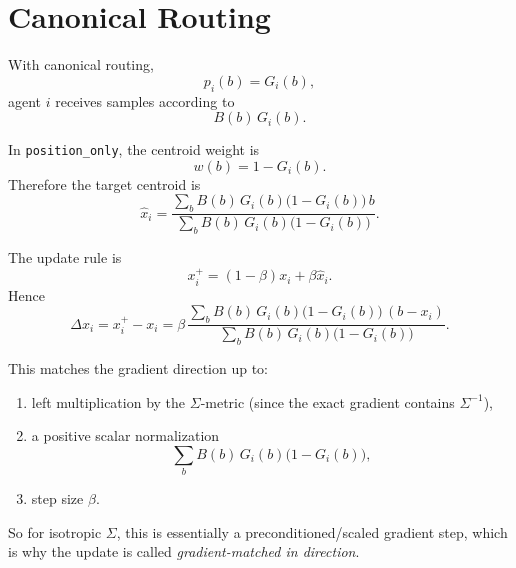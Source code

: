\documentclass{article}
\begin{document}
\section*{Canonical Routing}

With canonical routing,
\begin{equation*}
p_i(b) = G_i(b),
\end{equation*}
agent \(i\) receives samples according to
\begin{equation*}
B(b)\,G_i(b).
\end{equation*}

In \texttt{position\_only}, the centroid weight is
\begin{equation*}
w(b) = 1 - G_i(b).
\end{equation*}
Therefore the target centroid is
\begin{equation*}
\hat{x}_i
=
\frac{
\sum_b B(b)\,G_i(b)\bigl(1-G_i(b)\bigr)\,b
}{
\sum_b B(b)\,G_i(b)\bigl(1-G_i(b)\bigr)
}.
\end{equation*}

The update rule is
\begin{equation*}
x_i^{+} = (1-\beta)x_i + \beta \hat{x}_i.
\end{equation*}
Hence
\begin{equation*}
\Delta x_i
=
x_i^{+}-x_i
=
\beta\,
\frac{
\sum_b B(b)\,G_i(b)\bigl(1-G_i(b)\bigr)\,(b-x_i)
}{
\sum_b B(b)\,G_i(b)\bigl(1-G_i(b)\bigr)
}.
\end{equation*}

This matches the gradient direction up to:
\begin{enumerate}
\item left multiplication by the \(\Sigma\)-metric (since the exact gradient contains \(\Sigma^{-1}\)),
\item a positive scalar normalization
\begin{equation*}
\sum_b B(b)\,G_i(b)\bigl(1-G_i(b)\bigr),
\end{equation*}
\item step size \(\beta\).
\end{enumerate}

So for isotropic \(\Sigma\), this is essentially a preconditioned/scaled gradient step, which is why the update is called \emph{gradient-matched in direction}.
\end{document}
